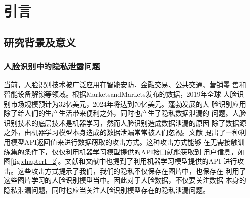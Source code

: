 
\chapter{引言}

\section{研究背景及意义}

\subsection{人脸识别中的隐私泄露问题}
当前，人脸识别技术被广泛应用在智能安防、金融交易、公共交通、营销零
售和智能设备解锁等领域。根据MarketsandMarkets发布的数据，2019年全球
人脸识别市场规模预计为32亿美元，2024年将达到70亿美元\cite{marketsmarkets2019}。蓬勃发展的人
脸识别应用除了给人们的生产生活带来便利之外，同时也产生了隐私数据泄漏的
问题。人脸识别技术的底层技术是机器学习，然而人脸识别造成数据泄漏的原因
除了数据源之外，由机器学习模型本身造成的数据泄漏常常被人们忽视。文献\cite{10.5555/3241094.3241142}
提出了一种利用模型API返回值来进行数据窃取的攻击方式。这种攻击方式能够
在无需接触训练集的条件下，仅仅利用机器学习模型提供的API接口就能获取到
用户信息，如图\ref{fig:chapter1_2}。文献\cite{10.5555/3241094.3241142}和文献\cite{Fredrikson2015}中也提到了利用机器学习模型提供的API
进行攻击。这些攻击方式提示了我们，我们的隐私不仅保存在图片中，也保存在
利用了这些图片学习的人脸识别模型当中。因此对于人脸数据，不仅要关注数据
本身的隐私泄漏问题\cite{baiduwangxun2020,nandugeren2020,jiaziguangnian2020}，同时也应当关注人脸识别模型存在的隐私泄漏问题。


